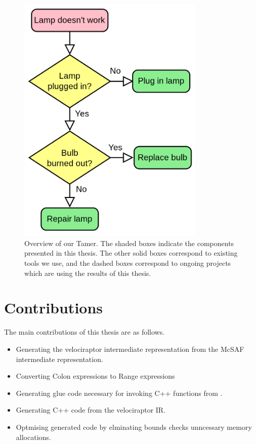 \begin{figure}[htbp]
\begin{center}
\includegraphics[width=3.5in]{Figures/overview.png}
\caption[Overview of the \matlab Tamer]{Overview
of our \matlab Tamer.  The shaded boxes indicate the components
presented in this thesis.  The other solid boxes correspond to
existing \mclab tools we use, and the dashed boxes correspond to
ongoing projects which are using the results of this
thesis.}\label{Fig:Overview}
\end{center}
\end{figure}
\section{Contributions}
The main contributions of this thesis are as follows.
\begin{itemize}
\item Generating the velociraptor intermediate representation from the McSAF intermediate representation. 
\item Converting Colon expressions to Range expressions
\item Generating glue code necessary for invoking C++ functions from \matlab.
\item Generating C++ code from the velociraptor IR.
\item Optmising generated code by elminating bounds checks unncessary memory allocations. 
\end{itemize}
